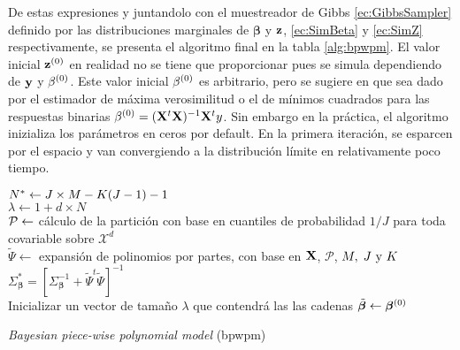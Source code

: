 \documentclass[../Main/Main.tex]{subfiles}
\begin{document}
De estas expresiones y juntandolo con el muestreador de Gibbs \eqref{ec:GibbsSampler} definido por las distribuciones marginales de $\bm{\beta}$ y $\zsn$,  \eqref{ec:SimBeta} y \eqref{ec:SimZ} respectivamente, se presenta el algoritmo final en la tabla \ref{alg:bpwpm}. El valor inicial $\zsn\iter{0}$ en realidad no se tiene que proporcionar pues se simula dependiendo de $\ysn$ y $\beta\iter{0}$. Este valor inicial $\beta\iter{0}$ es arbitrario, pero se sugiere en \citet{albert1993bayesian} que sea dado por el estimador de máxima verosimilitud o el de mínimos cuadrados para las respuestas binarias $\beta\iter{0} = (\xmat^t\xmat)^{-1}\xmat^ty$. Sin embargo en la práctica, el algoritmo inizializa los parámetros en ceros por default. En la primera iteración, se esparcen por el espacio y van convergiendo a la distribución límite en relativamente poco tiempo.

\begin{algorithm}[p]
 
 $\N \leftarrow J\times M - K(J-1) - 1$ \\
 $\lambda \leftarrow 1 + d\times N$ \\
 $\P \leftarrow$ cálculo de la partición con base en cuantiles de probabilidad $1/J$ para toda covariable sobre $\mathcal{X}^d$ \\
 $\widetilde{\Psi} \leftarrow $ expansión de polinomios por partes, con base en $\xmat$, $\mathcal{P}$, $\MJK$\\
 $\Sigma_{\bm{\beta}}^* = \left[\Sigma_{\bm{\beta}}^{-1} + \widetilde{\Psi}^t\widetilde{\Psi}\right]^{-1}	$ \\
 Inicializar un vector de tamaño $\lambda$ que contendrá las las cadenas $\tilde{\bm{\beta}} \leftarrow \bm{\beta}\iter{0}$\\
 \caption{\textit{Bayesian piece-wise polynomial model} (bpwpm)}
 \label{alg:bpwpm}
\end{algorithm}
\end{document}
